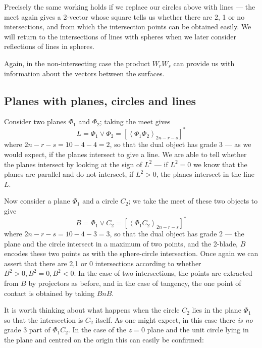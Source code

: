 Precisely the same working holds if we replace our
circles above with lines --- the meet again gives a
2-vector whose square tells us whether there are 2, 1 or
no intersections, and from which the intersection points
can be obtained easily. We will return to the
intersections of lines with spheres when we later
consider reflections of lines in spheres.

Again, in the non-intersecting case the product $W_rW_s$
can provide us with information about the vectors between
the surfaces.




\subsection{Planes with planes, circles and lines }

Consider two planes $\Phi_1$ and $\Phi_2$; taking the
meet gives
%
\begin{equation}
L = \Phi_1 \vee \Phi_2 = \left[\left< \Phi_1 \Phi_2
\right>_{2n-r-s}\right]^*
\end{equation}
%
where $2n-r-s=10-4-4=2$, so that the dual object has
grade 3 --- as we would expect, if the planes intersect to
give a line. We are able to tell whether the planes
intersect by looking at the sign of $L^2$ --- if $L^2=0$
we know that the planes are parallel and do not
intersect, if $L^2>0$, the planes intersect in the line
$L$.

Now consider a plane $\Phi_1$ and a circle $C_2$; we take
the meet of these two objects to give
%
\begin{equation}
B = \Phi_1 \vee C_2 = \left[\left< \Phi_1 C_2
\right>_{2n-r-s}\right]^*
\end{equation}
%
where $2n-r-s=10-4-3=3$, so that the dual object has
grade 2 --- the plane and the circle intersect in a
maximum of two points, and the 2-blade, $B$ encodes these
two points as with the sphere-circle intersection. Once
again we can assert that there are 2,1 or 0 intersections
according to whether $B^2>0,B^2=0,B^2<0$. In the case of
two intersections, the points are extracted from $B$ by
projectors as before, and in the case of tangency, the
one point of contact is obtained by taking $BnB$.

It is worth thinking about what happens when the circle
$C_2$ lies in the plane $\Phi_1$ so that the intersection is
$C_2$ itself. As one might expect, in this case there \emph{is
no} grade 3 part of $\Phi_1C_2$. In the case of the $z=0$ plane and
the unit circle lying in the plane and centred on the origin this can
easily be confirmed:

